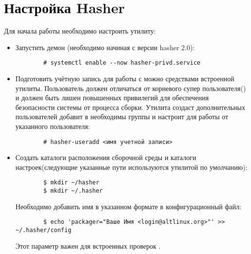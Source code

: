 \hypertarget{5.1}{\section{Настройка Hasher}}
Для начала работы необходимо настроить утилиту:
\begin{itemize}
	\item Запустить демон (необходимо начиная с версии hasher 2.0):
	\begin{verbatim}
		# systemctl enable --now hasher-privd.service
	\end{verbatim}
	
	\item Подготовить учётную запись для работы с  можно средствами встроенной утилиты.
	Пользователь должен отличаться от корневого супер пользователя() и должен быть
	лишен повышенных привилегий для обеспечения безопасности системы от процесса сборки.
	Утилита создаст дополнительных пользователей добавит в необходимы группы и настроит
	 для работы от указанного пользователя:
	\begin{verbatim}
		# hasher-useradd <имя учетной записи>
	\end{verbatim}
	
	\item Создать каталоги расположения сборочной среды и каталоги настроек(следующие указанные
	пути используются утилитой  по умолчанию):
	\begin{verbatim}
		$ mkdir ~/hasher
		$ mkdir ~/.hasher
	\end{verbatim}
	
	Необходимо добавить имя в указанном формате в конфигурационный файл:
	\begin{verbatim}
		$ echo 'packager="Ваше Имя <login@altlinux.org>"' >> ~/.hasher/config
	\end{verbatim}
	Этот параметр важен для встроенных проверок .
	

\end{itemize}

